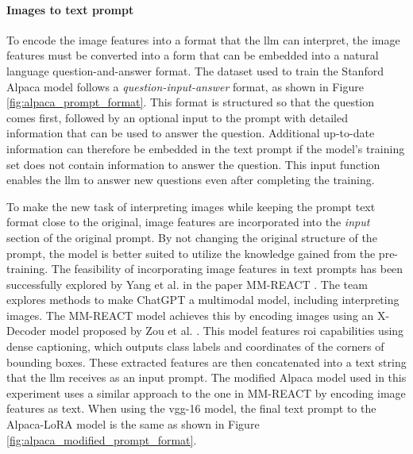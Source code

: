        \paragraph{Images to text prompt\\}
        To encode the image features into a format that the \gls{llm} can interpret, the image features must be converted into a form that can be embedded into a natural language question-and-answer format. The dataset used to train the Stanford Alpaca model follows a \textit{question-input-answer} format, as shown in Figure \ref{fig:alpaca_prompt_format}. This format is structured so that the question comes first, followed by an optional input to the prompt with detailed information that can be used to answer the question. Additional up-to-date information can therefore be embedded in the text prompt if the model's training set does not contain information to answer the question. This input function enables the \gls{llm} to answer new questions even after completing the training.
        
        To make the new task of interpreting images while keeping the prompt text format close to the original, image features are incorporated into the \textit{input} section of the original prompt. By not changing the original structure of the prompt, the model is better suited to utilize the knowledge gained from the pre-training. The feasibility of incorporating image features in text prompts has been successfully explored by Yang et al. in the paper MM-REACT \cite{yangMMREACTPromptingChatGPT2023}. 
        The team explores methods to make ChatGPT a multimodal model, including interpreting images.
        The MM-REACT model achieves this by encoding images using an X-Decoder model proposed by Zou et al. \cite{zouGeneralizedDecodingPixel2022}. This model features \gls{roi} capabilities using dense captioning, which outputs class labels and coordinates of the corners of bounding boxes. These extracted features are then concatenated into a text string that the \gls{llm} receives as an input prompt. 
        The modified Alpaca model used in this experiment uses a similar approach to the one in MM-REACT by encoding image features as text. When using the \gls{vgg}-16 model, the final text prompt to the Alpaca-LoRA model is the same as shown in Figure \ref{fig:alpaca_modified_prompt_format}.
        
